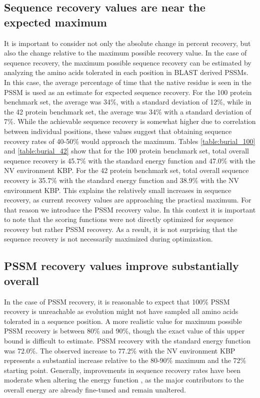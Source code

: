 \subsection{Sequence recovery values are near the expected maximum}
It is important to consider not only the absolute change in percent recovery, but also the change relative to the maximum possible recovery value.
In the case of sequence recovery, the maximum possible sequence recovery can be estimated by analyzing the amino acids tolerated in each position in \ac{BLAST} derived \ac{PSSM}s.
In this case, the average percentage of time that the native residue is seen in the \ac{PSSM} is used as an estimate for expected sequence recovery.
For the 100 protein benchmark set, the average was 34\%, with a standard deviation of 12\%, while in the 42 protein benchmark set, the average was 34\% with a standard deviation of 7\%.
While the achievable sequence recovery is somewhat higher due to correlation between individual positions, these values suggest that obtaining sequence recovery rates of 40-50\% would approach the maximum.
Tables \ref{table:burial_100} and \ref{table:burial_42} show that for the 100 protein benchmark set, total overall sequence recovery is 45.7\% with the standard energy function and 47.0\% with the \ac{NV} environment \ac{KBP}.
For the 42 protein benchmark set, total overall sequence recovery is 35.7\% with the standard energy function and 38.9\% with the \ac{NV} environment \ac{KBP}.
This explains the relatively small increases in sequence recovery, as current recovery values are approaching the practical maximum.
For that reason we introduce the \ac{PSSM} recovery value.
In this context it is important to note that the scoring functions were not directly optimized for sequence recovery but rather \ac{PSSM} recovery.
As a result, it is not surprising that the sequence recovery is not necessarily maximized during optimization. 

\subsection{PSSM recovery values improve substantially overall}
In the case of \ac{PSSM} recovery, it is reasonable to expect that 100\% \ac{PSSM} recovery is unreachable as evolution might not have sampled all amino acids tolerated in a sequence position.
A more realistic value for maximum possible \ac{PSSM} recovery is between 80\% and 90\%, though the exact value of this upper bound is difficult to estimate. \ac{PSSM} recovery with the standard energy function was 72.0\%.
The observed increase to 77.2\% with the \ac{NV} environment \ac{KBP} represents a substantial increase relative to the 80-90\% maximum and the 72\% starting point.
Generally, improvements in sequence recovery rates have been moderate when altering the energy function \citep{Kortemme:2003td}, as the major contributors to the overall energy are already fine-tuned and remain unaltered. 

